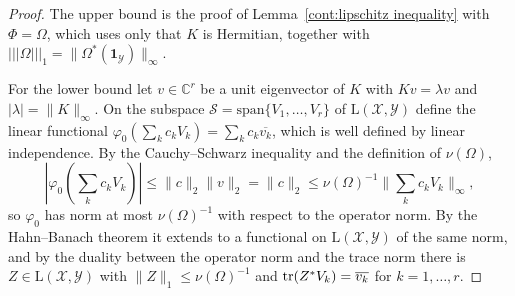 \begin{proof}
The upper bound is the proof of Lemma~\ref{cont:lipschitz inequality} with $\Phi=\Omega$, which uses only that $K$ is Hermitian, together with $|||\Omega|||_1=\|\Omega^*(\mathbf{1}_{\mathcal{Y}})\|_\infty$.

For the lower bound let $v\in\mathbb{C}^r$ be a unit eigenvector of $K$ with $Kv=\lambda v$ and $|\lambda|=\|K\|_\infty$. On the subspace $\mathcal{S}=\mathrm{span}\{V_1,\dots,V_r\}$ of $\mathrm{L}(\mathcal{X},\mathcal{Y})$ define the linear functional $\varphi_0(\sum_kc_kV_k)=\sum_kc_k\overline{v_k}$, which is well defined by linear independence. By the Cauchy--Schwarz inequality and the definition of $\nu(\Omega)$,
\[
|\varphi_0(\textstyle\sum_kc_kV_k)|\leq\|c\|_2\|v\|_2=\|c\|_2\leq\nu(\Omega)^{-1}\|\textstyle\sum_kc_kV_k\|_\infty,
\]
so $\varphi_0$ has norm at most $\nu(\Omega)^{-1}$ with respect to the operator norm. By the Hahn--Banach theorem it extends to a functional on $\mathrm{L}(\mathcal{X},\mathcal{Y})$ of the same norm, and by the duality between the operator norm and the trace norm \cite[Section~1.1.3]{watrous2018theory} there is $Z\in\mathrm{L}(\mathcal{X},\mathcal{Y})$ with $\|Z\|_1\leq\nu(\Omega)^{-1}$ and $\operatorname{tr}(Z^*V_k)=\overline{v_k}$ for $k=1,\dots,r$.


\end{proof}
